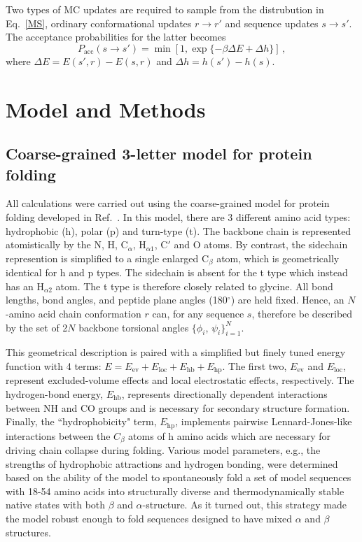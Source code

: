 \documentclass[
aip,
rsi,%
amsmath,amssymb,
reprint,%
]{revtex4-1}
\newcommand	 {\sbar}	{{s}}
\newcommand	 {\rbar}	{{r}}
\begin{document}
Two types of MC updates are required to sample from the distrubution in Eq.~\ref{MS}, ordinary conformational updates $\rbar\rightarrow\rbar'$ and {\color{red} sequence} updates $\sbar\rightarrow\sbar'$. The acceptance probabilities for the latter  becomes
\begin{equation}
P_\mathrm{acc} (\sbar\rightarrow\sbar') = \min [1, \exp\{-\beta\Delta E+\Delta h\}]\,,
\label{accrej}
\end{equation}
where $\Delta E = E(\sbar',\rbar)-E(\sbar,\rbar)$ and $\Delta h = h({\sbar'})-h(\sbar)$.

\section{Model and Methods}
\subsection{Coarse-grained 3-letter model for protein folding}

All calculations were carried out using the coarse-grained model for protein folding developed in Ref.~. In this model, there are 3 different amino acid types: hydrophobic (h), polar (p) and turn-type (t). The backbone chain is represented atomistically by the N, H, $\mathrm{C}_\alpha$, $\mathrm{H}_{\alpha 1}$, C$'$ and O atoms. By contrast, the sidechain represention is simplified to a single enlarged $\mathrm{C}_\beta$ atom, which is geometrically identical for h and p types. The sidechain is absent for the t type which instead has an $\mathrm{H}_{\alpha 2}$ atom. The t type is therefore closely related to glycine. All bond lengths, bond angles, and peptide plane angles (180$^\circ$) are held fixed. Hence, an $N$-amino acid chain conformation $\rbar$ can, for any sequence $\sbar$, therefore be described by the set of 2$N$ backbone torsional angles $\{\phi_i$, $\psi_i\}_{i=1}^{N}$. 
 
This geometrical description is paired with a simplified but finely tuned energy function with 4 terms: $E= E_\mathrm{ev} + E_\mathrm{loc} + E_\mathrm{hb} + E_\mathrm{hp}$. The first two, $E_\mathrm{ev}$ and $E_\mathrm{loc}$, represent excluded-volume effects and local electrostatic effects, respectively. The hydrogen-bond energy, $E_\mathrm{hb}$, represents directionally dependent interactions between NH and CO groups and is necessary for secondary structure formation. Finally, the ``hydrophobicity" term, $E_\mathrm{hp}$, implements pairwise Lennard-Jones-like interactions between the $C_\beta$ atoms of h amino acids which are necessary for driving chain collapse during folding. Various model parameters, e.g., the strengths of hydrophobic attractions and hydrogen bonding, were determined based on the ability of the model to spontaneously fold a set of model sequences with 18-54 amino acids into  structurally diverse and thermodynamically stable native states with both $\beta$ and $\alpha$-structure. As it turned out, this strategy made the model robust enough to fold sequences designed to have mixed $\alpha$ and $\beta$ structures. 
\end{document}
